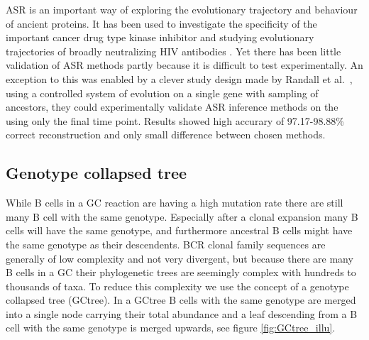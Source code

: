ASR is an important way of exploring the evolutionary trajectory and behaviour of ancient proteins.
It has been used to investigate the specificity of the important cancer drug type kinase inhibitor \cite{Wilson2015-vi} and studying evolutionary trajectories of broadly neutralizing HIV antibodies \cite{Doria-Rose2014-vi}.
Yet there has been little validation of ASR methods partly because it is difficult to test experimentally.
An exception to this was enabled by a clever study design made by Randall et al.\ \cite{randall2016experimental}, using a controlled system of evolution on a single gene with sampling of ancestors, they could experimentally validate ASR inference methods on the using only the final time point.
Results showed high accurary of 97.17-98.88\% correct reconstruction and only small difference between chosen methods.




\subsection{Genotype collapsed tree}
While B cells in a GC reaction are having a high mutation rate there are still many B cell with the same genotype.
Especially after a clonal expansion many B cells will have the same genotype, and furthermore ancestral B cells might have the same genotype as their descendents.
BCR clonal family sequences are generally of low complexity and not very divergent, but because there are many B cells in a GC their phylogenetic trees are seemingly complex with hundreds to thousands of taxa.
To reduce this complexity we use the concept of a genotype collapsed tree (GCtree).
In a GCtree B cells with the same genotype are merged into a single node carrying their total abundance and a leaf descending from a B cell with the same genotype is merged upwards, see figure \ref{fig:GCtree_illu}.


